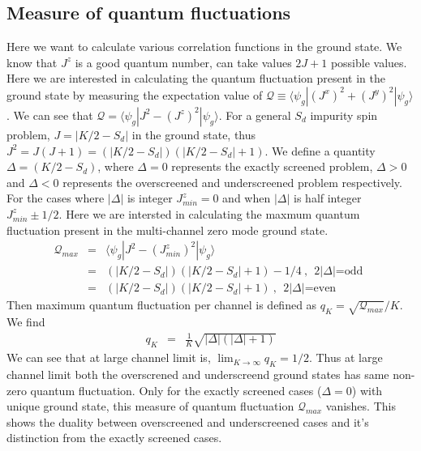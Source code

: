 \documentclass[reprint,prb,superscriptaddress]{revtex4-2}
\begin{document}
\subsection{Measure of quantum fluctuations}
\noindent Here we want to calculate various correlation functions in the ground state. We know that $J^z$ is a good quantum number, can take values $2J+1$ possible values. Here we are interested in calculating the quantum fluctuation present in the  ground state by measuring the expectation value of ${\mathcal{Q}}\equiv \langle \psi_g | (J^x)^2+(J^y)^2 |\psi_g\rangle$. We can see that ${\mathcal{Q}}= \langle \psi_g | J^2 - (J^z)^2 |\psi_g\rangle$. For a general $S_d$ impurity spin problem, $J=|K/2-S_d|$ in the ground state, thus $J^2=J(J+1)=(|K/2-S_d|)(|K/2-S_d|+1)$. We define a quantity $\Delta=(K/2-S_d)$, where $\Delta=0$ represents the exactly screened problem, $\Delta>0$ and $\Delta<0$ represents the overscreened and underscreened problem respectively. For the cases where $|\Delta|$ is integer $J^z_{min}=0$ and when $|\Delta|$ is half integer $J^z_{min}\pm 1/2$. Here we are intersted in calculating the maxmum quantum fluctuation present in the multi-channel zero mode ground state.
\begin{eqnarray}
\mathcal{Q}_{max}&=&   \langle \psi_g | J^2 - (J^z_{min})^2 |\psi_g\rangle \nonumber\\
&=&(|K/2-S_d|)(|K/2-S_d|+1)-1/4~,~~\textrm{$2|\Delta|$=odd}~~  \nonumber\\
&=&(|K/2-S_d|)(|K/2-S_d|+1) ~,~~\textrm{$2|\Delta|$=even}~~
\end{eqnarray}
Then maximum quantum fluctuation per channel is defined as $q_K=\sqrt{\mathcal{Q}_{max}}/K$. We find
\begin{eqnarray}
q_K &=&  \frac{1}{K} \sqrt{|\Delta|(|\Delta|+1)}
\end{eqnarray}
We can see that at large channel limit is, $\lim_{K\rightarrow \infty} q_K= 1/2$. Thus at large channel limit both the 
overscrened and underscreend ground states has same non-zero quantum fluctuation. Only for the exactly screened cases ($\Delta=0$) with unique ground state, this measure of quantum fluctuation $\mathcal{Q}_{max}$ vanishes. This shows the duality between overscreened and underscreened cases and it's distinction from the exactly screened cases.
\end{document}
